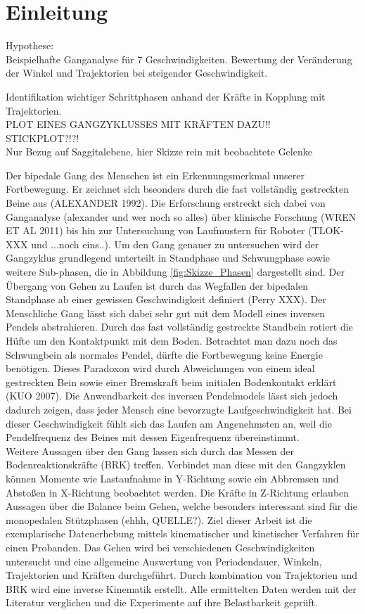 \section{Einleitung}
Hypothese:\\
Beispielhafte Ganganalyse für 7 Geschwindigkeiten.
Bewertung der Veränderung der Winkel und Trajektorien bei steigender Geschwindigkeit.

Identifikation wichtiger Schrittphasen anhand der Kräfte in Kopplung mit Trajektorien.\\

PLOT EINES GANGZYKLUSSES MIT KRÄFTEN DAZU!!\\
STICKPLOT?!?!\\
Nur Bezug auf Saggitalebene, hier Skizze rein mit beobachtete Gelenke

Der bipedale Gang des Menschen ist ein Erkennungsmerkmal unserer Fortbewegung. Er zeichnet sich bseonders durch die fast vollständig gestreckten Beine aus (ALEXANDER 1992). Die Erforschung erstreckt sich dabei von Ganganalyse (alexander und wer noch so alles) über klinische Forschung (WREN ET AL 2011) bis hin zur Untersuchung von Laufmustern für Roboter (TLOK-XXX und ...noch eins..).
Um den Gang genauer zu untersuchen wird der Gangzyklus grundlegend unterteilt in Standphase und Schwungphase sowie weitere Sub-phasen, die in Abbildung \ref{fig:Skizze_Phasen} dargestellt sind. Der Übergang von Gehen zu Laufen ist durch das Wegfallen der bipedalen Standphase ab einer gewissen Geschwindigkeit definiert (Perry XXX).
Der Menschliche Gang lässt sich dabei sehr gut mit dem Modell eines inversen Pendels abstrahieren. Durch das fast vollständig gestreckte Standbein rotiert die Hüfte um den Kontaktpunkt mit dem Boden. Betrachtet man dazu noch das Schwungbein als normales Pendel, dürfte die Fortbewegung keine Energie benötigen. Dieses Paradoxon wird durch Abweichungen von einem ideal gestreckten Bein sowie einer Bremskraft beim initialen Bodenkontakt erklärt (KUO 2007). 
Die Anwendbarkeit des inversen Pendelmodels lässt sich jedoch dadurch zeigen, dass jeder Mensch eine bevorzugte Laufgeschwindigkeit hat. Bei dieser Geschwindigkeit fühlt sich das Laufen am Angenehmsten an, weil die Pendelfrequenz des Beines mit dessen Eigenfrequenz übereinstimmt.\\
Weitere Aussagen über den Gang lassen sich durch das Messen der Bodenreaktionskräfte (BRK) treffen. Verbindet man diese mit den Gangzyklen können Momente wie Lastaufnahme in Y-Richtung sowie ein Abbremsen und Abstoßen in X-Richtung beobachtet werden. Die Kräfte in Z-Richtung erlauben Aussagen über die Balance beim Gehen, welche besonders interessant sind für die monopedalen Stützphasen (ehhh, QUELLE?).
Ziel dieser Arbeit ist die exemplarische Datenerhebung mittels kinematischer und kinetischer Verfahren für einen Probanden. Das Gehen wird bei verschiedenen Geschwindigkeiten untersucht und eine allgemeine Auswertung von Periodendauer, Winkeln, Trajektorien und Kräften durchgeführt. Durch kombination von Trajektorien und BRK wird eine inverse Kinematik erstellt. Alle ermittelten Daten werden mit der Literatur verglichen und die Experimente auf ihre Belastbarkeit geprüft.

